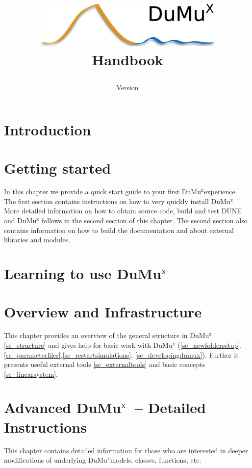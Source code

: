 \documentclass[11pt,a4paper,headinclude,footinclude,DIV16]{scrreprt}
\title{
\begin{center}
\includegraphics[width=0.7\textwidth]{../logo/dumux_logo_hires_whitebg.png}
\\[3cm]
{\Huge Handbook}
\end{center}
}
\author{}
\date{Version \DumuxVersion}
\newcommand{\Dune}{{DUNE}\xspace}
\newcommand{\Dumux}{\texorpdfstring{Du\-Mu$^\text{x}$\xspace}{DuMuX\xspace}}
\begin{document}
\maketitle

\setcounter{tocdepth}{1}
\tableofcontents
\newpage

\chapter{Introduction}


\chapter{Getting started}
In this chapter we provide a quick start guide to
your first \Dumux experience.
The first section contains instructions on how to very quickly install \Dumux.
More detailed information on how to obtain source code, build and test \Dune and \Dumux
follows in the second section of this chapter. The second section also contains information on
how to build the documentation and about external libraries and modules.



\chapter{Learning to use \Dumux}\label{chp:tutorial}



\chapter{Overview and Infrastructure}
This chapter provides an overview of the general structure in \Dumux \ref{sc_structure}
and gives help for basic work with \Dumux
(\ref{sc_newfoldersetup},\ref{sc_parameterfiles},\ref{sc_restartsimulations}, \ref{sc_developingdumux}).
Further it presents useful external tools \ref{sc_externaltools} and basic
concepts \ref{sc_linearsystem}.








\chapter{Advanced \Dumux\ -- Detailed Instructions}
This chapter contains detailed information for those who are interested
in deeper modifications of underlying \Dumux models, classes, functions, etc.








\printindex
\end{document}
